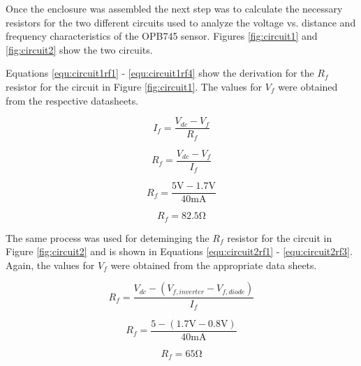 \documentclass[CMPE]{KGCOEReport}
\begin{document}
Once the enclosure was assembled the next step was to calculate the necessary 
resistors for the two different circuits used to analyze the voltage vs. distance
and frequency characteristics of the OPB745 sensor. Figures \ref{fig:circuit1} and 
\ref{fig:circuit2} show the two circuits. 



Equations \ref{equ:circuit1rf1} - \ref{equ:circuit1rf4}
show the derivation for the $R_f$ resistor for the circuit in Figure \ref{fig:circuit1}. The 
values for $V_f$ were obtained from the respective datasheets.

\begin{equation}
	\label{equ:circuit1rf1}
	I_f=\frac{V_{dc} - V_f}{R_f}
\end{equation}

\begin{equation}
	\label{equ:circuit1rf2}
	R_f=\frac{V_{dc} - V_f}{I_f}
\end{equation}

\begin{equation}
	\label{equ:circuit1rf3}
	R_f=\frac{5\si\volt - 1.7\si\volt}{40 \si{\milli\ampere}}
\end{equation}

\begin{equation}
	\label{equ:circuit1rf4}
	R_f= 82.5 \si\ohm
\end{equation}

The same process was used for deteminging the $R_f$ resistor for the circuit in Figure \ref{fig:circuit2}
and is shown in Equations \ref{equ:circuit2rf1} - \ref{equ:circuit2rf3}. Again, the values for $V_f$ were
obtained from the appropriate data sheets.

\begin{equation}
	\label{equ:circuit2rf1}
	R_f=\frac{V_{dc} - (V_{f,inverter} - V_{f,diode})}{I_f}
\end{equation}

\begin{equation}
	\label{equ:circuit2rf2}
	R_f=\frac{5 - (1.7\si\volt - 0.8\si\volt)}{40\si{\milli\ampere}}
\end{equation}

\begin{equation}
	\label{equ:circuit2rf3}
	R_f=65\si\ohm
\end{equation}
\end{document}
